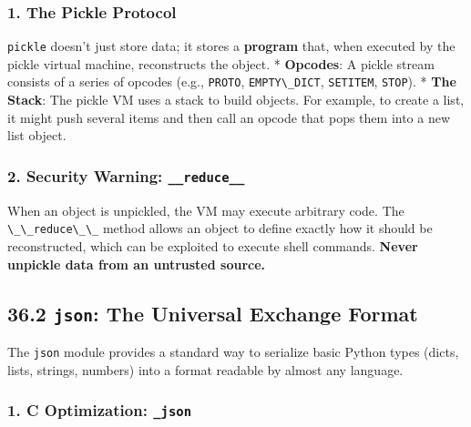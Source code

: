 \hypertarget{the-pickle-protocol}{%
\subsubsection{1. The Pickle Protocol}\label{the-pickle-protocol}}

\passthrough{\lstinline!pickle!} doesn't just store data; it stores a
\textbf{program} that, when executed by the pickle virtual machine,
reconstructs the object. * \textbf{Opcodes}: A pickle stream consists of
a series of opcodes (e.g., \passthrough{\lstinline!PROTO!},
\passthrough{\lstinline!EMPTY\_DICT!},
\passthrough{\lstinline!SETITEM!}, \passthrough{\lstinline!STOP!}). *
\textbf{The Stack}: The pickle VM uses a stack to build objects. For
example, to create a list, it might push several items and then call an
opcode that pops them into a new list object.

\hypertarget{security-warning-__reduce__}{%
\subsubsection{\texorpdfstring{2. Security Warning:
\texttt{\_\_reduce\_\_}}{2. Security Warning: \_\_reduce\_\_}}\label{security-warning-__reduce__}}

When an object is unpickled, the VM may execute arbitrary code. The
\passthrough{\lstinline!\_\_reduce\_\_!} method allows an object to
define exactly how it should be reconstructed, which can be exploited to
execute shell commands. \textbf{Never unpickle data from an untrusted
source.}

\hypertarget{json-the-universal-exchange-format}{%
\subsection{\texorpdfstring{36.2 \texttt{json}: The Universal Exchange
Format}{36.2 json: The Universal Exchange Format}}\label{json-the-universal-exchange-format}}

The \passthrough{\lstinline!json!} module provides a standard way to
serialize basic Python types (dicts, lists, strings, numbers) into a
format readable by almost any language.

\hypertarget{c-optimization-_json}{%
\subsubsection{\texorpdfstring{1. C Optimization:
\texttt{\_json}}{1. C Optimization: \_json}}\label{c-optimization-_json}}

